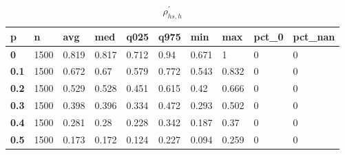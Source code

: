 \begin{table}[h]
 \centering 
\footnotesize
\caption{$\rho_{hs,h}^\prime $}
\label{tab:alphahsh}
\begin{tabular}[h]{|l|l|l|l|l|l|l|l|l|l|
    } \hline
\textbf{ p} & \textbf{ n} & \textbf{ avg} & \textbf{ med} & \textbf{ q025} & \textbf{ q975} & \textbf{ min} & \textbf{ max} & \textbf{ pct\_0} & \textbf{ pct\_nan}
    \\ \hline
  \textbf{  0} & 1500 & 0.819 & 0.817 & 0.712 &  0.94 & 0.671 &     1 & 0 & 0
    \\ \hline
  \textbf{0.1} & 1500 & 0.672 &  0.67 & 0.579 & 0.772 & 0.543 & 0.832 & 0 & 0
    \\ \hline
  \textbf{0.2} & 1500 & 0.529 & 0.528 & 0.451 & 0.615 &  0.42 & 0.666 & 0 & 0
    \\ \hline
  \textbf{0.3} & 1500 & 0.398 & 0.396 & 0.334 & 0.472 & 0.293 & 0.502 & 0 & 0
    \\ \hline
  \textbf{0.4} & 1500 & 0.281 &  0.28 & 0.228 & 0.342 & 0.187 &  0.37 & 0 & 0
    \\ \hline
  \textbf{0.5} & 1500 & 0.173 & 0.172 & 0.124 & 0.227 & 0.094 & 0.259 & 0 & 0
    \\ \hline
 \end{tabular}
 \end{table}
